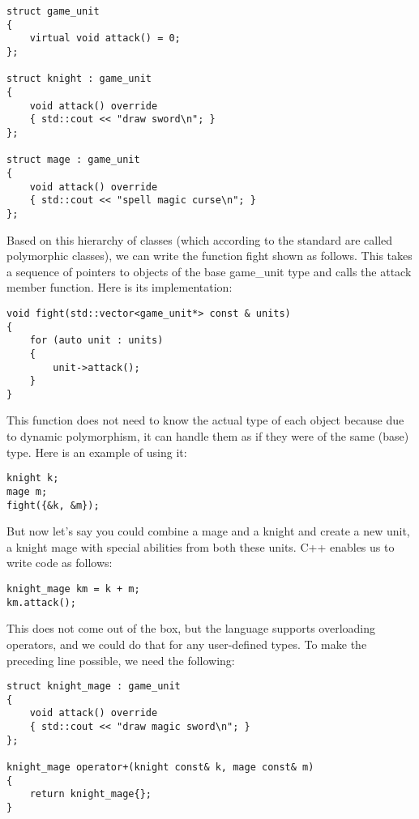 \begin{lstlisting}[style=styleCXX]
struct game_unit
{
	virtual void attack() = 0;
};

struct knight : game_unit
{
	void attack() override
	{ std::cout << "draw sword\n"; }
};

struct mage : game_unit
{
	void attack() override
	{ std::cout << "spell magic curse\n"; }
};
\end{lstlisting}

Based on this hierarchy of classes (which according to the standard are called polymorphic classes), we can write the function fight shown as follows. This takes a sequence of pointers to objects of the base game\_unit type and calls the attack member function. Here is its implementation:

\begin{lstlisting}[style=styleCXX]
void fight(std::vector<game_unit*> const & units)
{
	for (auto unit : units)
	{
		unit->attack();
	}
}
\end{lstlisting}

This function does not need to know the actual type of each object because due to dynamic polymorphism, it can handle them as if they were of the same (base) type. Here is an example of using it:

\begin{lstlisting}[style=styleCXX]
knight k;
mage m;
fight({&k, &m});
\end{lstlisting}

But now let’s say you could combine a mage and a knight and create a new unit, a knight mage with special abilities from both these units. C++ enables us to write code as follows:

\begin{lstlisting}[style=styleCXX]
knight_mage km = k + m;
km.attack();
\end{lstlisting}

This does not come out of the box, but the language supports overloading operators, and we could do that for any user-defined types. To make the preceding line possible, we need the following:

\begin{lstlisting}[style=styleCXX]
struct knight_mage : game_unit
{
	void attack() override
	{ std::cout << "draw magic sword\n"; }
};

knight_mage operator+(knight const& k, mage const& m)
{
	return knight_mage{};
}
\end{lstlisting}

